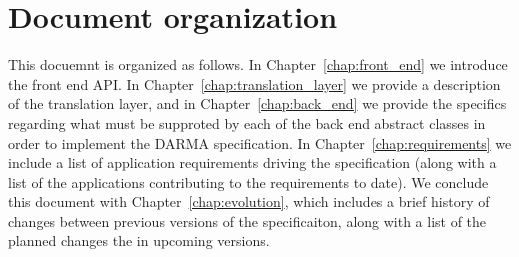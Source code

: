 








\section{Document organization}
\label{sec:organization}
This docuemnt is organized as follows.  In Chapter~\ref{chap:front_end} we
introduce the \gls{front end} \gls{API}.  In
Chapter~\ref{chap:translation_layer} we
provide a description of the \gls{translation layer}, and in
Chapter~\ref{chap:back_end} we provide the specifics regarding what must be
supproted by each of the \gls{back end} abstract classes in order to implement
the DARMA specification. In Chapter~\ref{chap:requirements} we include a list
of application requirements driving the specification (along with a list of the
    applications contributing to the requirements to date).
We conclude this document with
Chapter~\ref{chap:evolution}, which includes a brief history of changes between
previous versions of the specificaiton, along with a list of the planned changes the
in upcoming versions.

